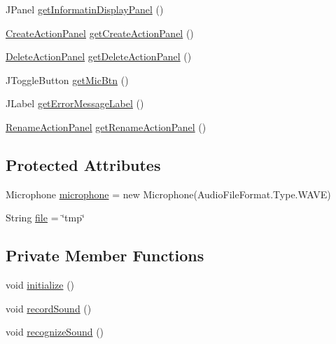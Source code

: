 \begin{DoxyCompactItemize}
\item 
J\-Panel \hyperlink{classcom_1_1poly_1_1nlp_1_1filekommander_1_1views_1_1_file_kommander_g_u_i_v2_a3a1224e74fee009bbfd7d0319657ab12}{get\-Informatin\-Display\-Panel} ()
\item 
\hyperlink{classcom_1_1poly_1_1nlp_1_1filekommander_1_1views_1_1panels_1_1_create_action_panel}{Create\-Action\-Panel} \hyperlink{classcom_1_1poly_1_1nlp_1_1filekommander_1_1views_1_1_file_kommander_g_u_i_v2_ac6b6c120c4d9f7c164cd678769d91b77}{get\-Create\-Action\-Panel} ()
\item 
\hyperlink{classcom_1_1poly_1_1nlp_1_1filekommander_1_1views_1_1panels_1_1_delete_action_panel}{Delete\-Action\-Panel} \hyperlink{classcom_1_1poly_1_1nlp_1_1filekommander_1_1views_1_1_file_kommander_g_u_i_v2_a7fa2fea7eb89bb77ca12e95e8b4b7b66}{get\-Delete\-Action\-Panel} ()
\item 
J\-Toggle\-Button \hyperlink{classcom_1_1poly_1_1nlp_1_1filekommander_1_1views_1_1_file_kommander_g_u_i_v2_ad66f883dbcaa86db8960a9bb7da0c987}{get\-Mic\-Btn} ()
\item 
J\-Label \hyperlink{classcom_1_1poly_1_1nlp_1_1filekommander_1_1views_1_1_file_kommander_g_u_i_v2_a6ce1322fa3b42f1e1e7d5e652d354ae5}{get\-Error\-Message\-Label} ()
\item 
\hyperlink{classcom_1_1poly_1_1nlp_1_1filekommander_1_1views_1_1panels_1_1_rename_action_panel}{Rename\-Action\-Panel} \hyperlink{classcom_1_1poly_1_1nlp_1_1filekommander_1_1views_1_1_file_kommander_g_u_i_v2_a500e5b53d9d8afe00084cc2a5b25df0d}{get\-Rename\-Action\-Panel} ()
\end{DoxyCompactItemize}
\subsection*{Protected Attributes}
\begin{DoxyCompactItemize}
\item 
Microphone \hyperlink{classcom_1_1poly_1_1nlp_1_1filekommander_1_1views_1_1_file_kommander_g_u_i_v2_aa4fb86851a7d16c0aed54ffa2a4d494a}{microphone} = new Microphone(Audio\-File\-Format.\-Type.\-W\-A\-V\-E)
\item 
String \hyperlink{classcom_1_1poly_1_1nlp_1_1filekommander_1_1views_1_1_file_kommander_g_u_i_v2_a151b6936eccece1d1245219a3106d70f}{file} = \char`\"{}tmp\char`\"{}
\end{DoxyCompactItemize}
\subsection*{Private Member Functions}
\begin{DoxyCompactItemize}
\item 
void \hyperlink{classcom_1_1poly_1_1nlp_1_1filekommander_1_1views_1_1_file_kommander_g_u_i_v2_a1e080fa83a2f013cff19e1aa29703d87}{initialize} ()
\item 
void \hyperlink{classcom_1_1poly_1_1nlp_1_1filekommander_1_1views_1_1_file_kommander_g_u_i_v2_ae9828d55c286cc8eab2d17a749842502}{record\-Sound} ()
\item 
void \hyperlink{classcom_1_1poly_1_1nlp_1_1filekommander_1_1views_1_1_file_kommander_g_u_i_v2_a295583a8fda103b47211ac51b03a37fb}{recognize\-Sound} ()
\end{DoxyCompactItemize}
